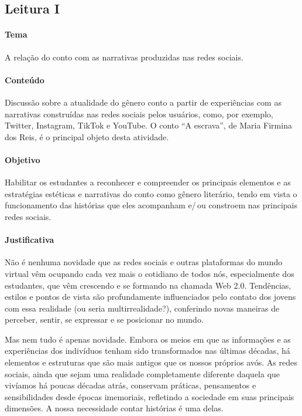 \documentclass[12pt]{extarticle}
\begin{document}
\subsection{Leitura I}

\paragraph{Tema} A relação do conto com as narrativas produzidas nas redes sociais. 

\paragraph{Conteúdo} Discussão sobre a atualidade do gênero conto a partir
de experiências com as narrativas construídas nas redes sociais pelos
usuários, como, por exemplo, Twitter, Instagram, TikTok e YouTube. O
conto ``A escrava'', de Maria Firmina dos Reis, é o principal objeto
desta atividade.

\paragraph{Objetivo} Habilitar os estudantes a reconhecer e compreender os
principais elementos e as estratégias estéticas e narrativas do conto
como gênero literário, tendo em vista o funcionamento das histórias que
eles acompanham e/\,ou constroem nas principais redes sociais.

\paragraph{Justificativa} Não é nenhuma novidade que as redes sociais e
outras plataformas do mundo virtual vêm ocupando cada vez mais o
cotidiano de todos nós, especialmente dos estudantes, que vêm crescendo
e se formando na chamada Web 2.0. Tendências, estilos e pontos de vista
são profundamente influenciados pelo contato dos jovens com essa
realidade (ou seria multirrealidade?), conferindo novas maneiras de
perceber, sentir, se expressar e se posicionar no mundo.

Mas nem tudo é apenas novidade. Embora os meios em que as informações e
as experiências dos indivíduos tenham sido transformados nas últimas
décadas, há elementos e estruturas que são mais antigos que os nossos
próprios avós. As redes sociais, ainda que sejam uma realidade
completamente diferente daquela que vivíamos há poucas décadas atrás,
conservam práticas, pensamentos e sensibilidades desde épocas
imemoriais, refletindo a sociedade em suas principais dimensões. A nossa
necessidade contar histórias é uma delas.
\end{document}
